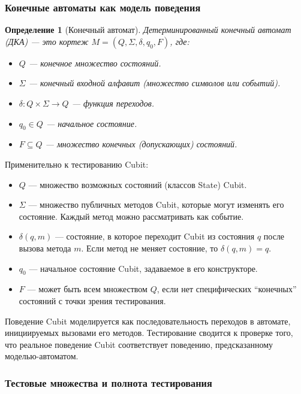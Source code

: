 \documentclass[14pt, russian]{scrartcl}
\newcommand{\enq}[1]{\enquote{#1}}
\newcounter{cDefinition}
\newtheorem{Definition}{Определение}[cDefinition]
\begin{document}
\subsubsection{Конечные автоматы как модель поведения}

\begin{Definition}[Конечный автомат]
Детерминированный конечный автомат (ДКА) — это кортеж $M = (Q, \Sigma, \delta, q_0, F)$, где:
\begin{itemize}
    \item $Q$ — конечное множество состояний.
    \item $\Sigma$ — конечный входной алфавит (множество символов или событий).
    \item $\delta: Q \times \Sigma \rightarrow Q$ — функция переходов.
    \item $q_0 \in Q$ — начальное состояние.
    \item $F \subseteq Q$ — множество конечных (допускающих) состояний.
\end{itemize}
\end{Definition}

Применительно к тестированию Cubit:
\begin{itemize}
    \item $Q$ — множество возможных состояний (классов State) Cubit.
    \item $\Sigma$ — множество публичных методов Cubit, которые могут изменять его состояние. Каждый метод можно рассматривать как событие.
    \item $\delta(q, m)$ — состояние, в которое переходит Cubit из состояния $q$ после вызова метода $m$. Если метод не меняет состояние, то $\delta(q, m) = q$.
    \item $q_0$ — начальное состояние Cubit, задаваемое в его конструкторе.
    \item $F$ — может быть всем множеством $Q$, если нет специфических \enq{конечных} состояний с точки зрения тестирования.
\end{itemize}

Поведение Cubit моделируется как последовательность переходов в автомате, инициируемых вызовами его методов. Тестирование сводится к проверке того, что реальное поведение Cubit соответствует поведению, предсказанному моделью-автоматом.

\subsubsection{Тестовые множества и полнота тестирования}
\end{document}
